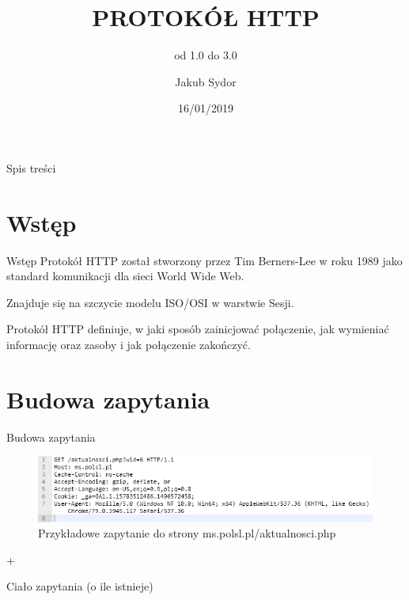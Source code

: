 \documentclass{beamer}
\title{PROTOKÓŁ HTTP}
\subtitle{od 1.0 do 3.0}
\author{Jakub Sydor}
\date{16/01/2019}
\begin{document}
\begin{frame}
  \maketitle
\end{frame}

\begin{frame}{Spis treści}
  \tableofcontents
\end{frame}

\section{Wstęp}
\begin{frame}{Wstęp}
  Protokół HTTP został stworzony przez Tim Berners-Lee w roku 1989 jako standard komunikacji dla sieci World Wide Web.
  
  \vspace{1cm}
  
  Znajduje się na szczycie modelu ISO/OSI w warstwie Sesji.
  
  \vspace{1cm}
 
  Protokół HTTP definiuje, w jaki sposób zainicjować połączenie, jak wymieniać informację oraz zasoby i jak połączenie zakończyć.
\end{frame}

\section{Budowa zapytania}
\begin{frame}{Budowa zapytania}
    \begin{figure}[request]
    \caption{Przykładowe zapytanie do strony ms.polsl.pl/aktualnosci.php}
    \centering
    \includegraphics[width=\textwidth]{images/request.png}
    \end{figure}
    \vspace{1pt}
    \begin{center}
        \begin{Huge}
            +
        \end{Huge}
    \end{center}
    \begin{center}
        Ciało zapytania (o ile istnieje)
    \end{center}
\end{frame}
\end{document}
